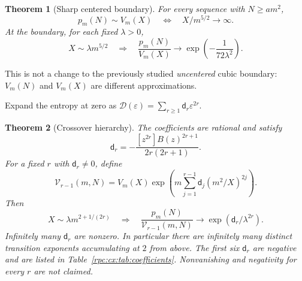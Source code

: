 \documentclass[11pt]{article}
\newtheorem{theorem}{Theorem}[section]
\theoremstyle{definition}
\theoremstyle{remark}
\numberwithin{equation}{section}
\begin{document}
\begin{theorem}[Sharp centered boundary]\label{rpc:cx:thm:boundary}
For every sequence with $N\ge am^2$,
\begin{equation}\label{rpc:cx:eq:iff}
 p_m(N)\sim V_m(X)
 \quad\Longleftrightarrow\quad X/m^{5/2}\longrightarrow\infty.
\end{equation}
At the boundary, for each fixed $\lambda>0$,
\begin{equation}\label{rpc:cx:eq:firstboundary}
 X\sim\lambda m^{5/2}
 \quad\Longrightarrow\quad
 \frac{p_m(N)}{V_m(X)}\longrightarrow
 \exp\!\left(-\frac1{72\lambda^2}\right).
\end{equation}
\end{theorem}
This is not a change to the previously studied \emph{uncentered} cubic
boundary: $V_m(N)$ and $V_m(X)$ are different approximations.

Expand the entropy at zero as $\mathcal D(\varepsilon)=\sum_{r\ge1}\mathsf d_r\varepsilon^{2r}$.

\begin{theorem}[Crossover hierarchy]\label{rpc:cx:thm:hierarchy}
The coefficients are rational and satisfy
\begin{equation}\label{rpc:cx:eq:d-lagrange}
 \mathsf d_r=-\frac{[z^{2r}]B(z)^{2r+1}}{2r(2r+1)}.
\end{equation}
For a fixed $r$ with $\mathsf d_r\ne0$, define
\begin{equation}\label{rpc:cx:eq:Mr}
 \mathcal V_{r-1}(m,N)=V_m(X)
     \exp\!\left(m\sum_{j=1}^{r-1}\mathsf d_j(m^2/X)^{2j}\right).
\end{equation}
Then
\begin{equation}\label{rpc:cx:eq:hierarchy-limit}
 X\sim\lambda m^{2+1/(2r)}
 \quad\Longrightarrow\quad
 \frac{p_m(N)}{\mathcal V_{r-1}(m,N)}
       \longrightarrow \exp(\mathsf d_r/\lambda^{2r}).
\end{equation}
Infinitely many $\mathsf d_r$ are nonzero. In particular there are infinitely
many distinct transition exponents accumulating at $2$ from above.
The first six $\mathsf d_r$ are negative and are listed in
Table~\ref{rpc:cx:tab:coefficients}. Nonvanishing and negativity for \emph{every}
$r$ are not claimed.
\end{theorem}
\end{document}
